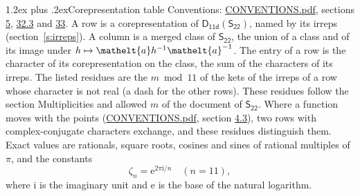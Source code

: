 \documentclass[10pt,a4paper]{article}
\makeatletter
\renewcommand\section{\@startsection{section}{1}{\z@}{-3ex plus -1ex minus -.2ex}%
  {1.2ex plus .2ex}{\normalfont\large\sffamily\bfseries\color{parttitle}}}
\numberwithin{equation}{section}
\newcommand{\eltfont}[1]{{\let\sigma\eltsigma\mathelt{#1}}}
\newcommand{\grp}[1]{\mathsf{#1}}
\newcommand{\elt}[1]{\eltfont{#1}}
\newcommand{\iunit}{\mathrm{i}}
\newcommand{\expe}{\mathrm{e}}
\newcommand{\rootunity}[1]{\zeta_{#1}}
\makeatother
\begin{document}
\section{Corepresentation table}\label{s:character_table}
Conventions: \href{../../CONVENTIONS.pdf}{CONVENTIONS.pdf}, sections \href{../../../rotation/CONVENTIONS.pdf\#conv.5}{5}, \href{../../CONVENTIONS.pdf\#conv.32.3}{32.3} and \href{../../CONVENTIONS.pdf\#conv.33}{33}.
A row is a corepresentation of $\grp{D_{11d}}(\grp{S_{22}})$, named by its irreps (section~\ref{s:irreps}). A column is a merged class of $\grp{S_{22}}$, the union of a class and of its image under $h \mapsto \elt{a} h^{-1} \elt{a}^{-1}$. The entry of a row is the character of its corepresentation on the class, the sum of the characters of its irreps.
\leavevmode\label{n:head.parity}The listed residues are the $m \bmod 11$ of the kets of the irreps of a row whose character is not real (a dash for the other rows). These residues follow the section Multiplicities and allowed $m$ of the document of \href{../../../rotation/data/pdf/S22.pdf}{$\grp{S_{22}}$}. Where a function moves with the points (\href{../../CONVENTIONS.pdf}{CONVENTIONS.pdf}, section \href{../../../rotation/CONVENTIONS.pdf\#conv.4.3}{4.3}), two rows with complex-conjugate characters exchange, and these residues distinguish them.
\leavevmode\label{n:constant.root}\label{n:index.root.order}Exact values are rationals, square roots, cosines and sines of rational multiples of $\pi$, and the constants
\begin{equation}\label{e:constants}\rootunity{n} = \expe^{2\pi\iunit/n}\quad(n = 11),\end{equation}
where $\iunit$ is the imaginary unit and $\expe$ is the base of the natural logarithm.
\end{document}
